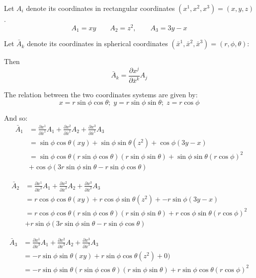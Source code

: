 \begin{solu}
 Let $A_i$ denote its coordinates in rectangular coordinates 
 $(x^1,x^2,x^3)=(x,y,z)$.
 \[A_1=xy \qquad A_2=z^2, \qquad A_3=3y-x \]

 Let $\bar{A}_k$ denote its coordinates in spherical coordinates $(\bar{x}^1,\bar{x}^2,\bar{x}^3)=(r,\phi,\theta)$:
 
 Then 
 \[\bar{A}_k=\frac{\partial x^j}{\partial \bar{x}^k}A_j\]
 
 The relation between the two coordinates systems are given by:
 \[
  x = r \sin \phi \cos\theta;\; y = r\sin\phi\sin\theta;\; z = r\cos\phi
\]

And so:
\begin{align}
\bar{A}_1&=
\frac{\partial x^1}{\partial \bar{x}^1}A_1+
\frac{\partial x^2}{\partial \bar{x}^1}A_2+
\frac{\partial x^3}{\partial \bar{x}^1}A_3\\ 
&=  \sin \phi \cos\theta(xy)+ \sin\phi\sin\theta(z^2) +
\cos\phi(3y-x)\\
&=  \sin \phi \cos\theta(r \sin \phi \cos\theta)(r\sin\phi\sin\theta)+ \sin\phi\sin\theta(r\cos\phi)^2\\
&+ \cos\phi(3r\sin\phi\sin\theta-r \sin \phi \cos\theta)
\end{align}


\begin{align}
\bar{A}_2&=
\frac{\partial x^1}{\partial \bar{x}^2}A_1+
\frac{\partial x^2}{\partial \bar{x}^2}A_2+
\frac{\partial x^3}{\partial \bar{x}^2}A_3\\ 
&=   r \cos \phi \cos\theta(xy)+ r\cos\phi\sin\theta(z^2) +
-r\sin\phi(3y-x)\\
&=   r \cos \phi \cos\theta(r \sin \phi \cos\theta)(r\sin\phi\sin\theta)+ r\cos\phi\sin\theta(r\cos\phi)^2\\
&+r\sin\phi(3r\sin\phi\sin\theta-r \sin \phi \cos\theta)
\end{align}

\begin{align}
\bar{A}_3&=
\frac{\partial x^1}{\partial \bar{x}^3}A_1+
\frac{\partial x^2}{\partial \bar{x}^3}A_2+
\frac{\partial x^3}{\partial \bar{x}^3}A_3\\ 
&=   -r \sin \phi \sin\theta(xy)+ r\sin\phi\cos\theta(z^2) +
0)\\
&=    -r \sin \phi \sin\theta(r \sin \phi \cos\theta)(r\sin\phi\sin\theta)+ r\sin\phi\cos\theta(r\cos\phi)^2  \\
\end{align}


\end{solu}

